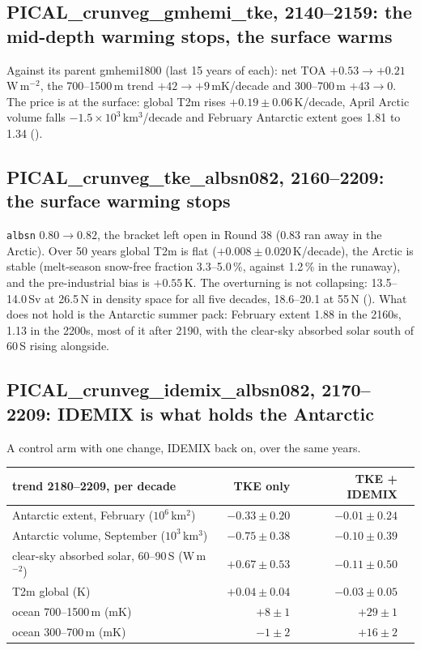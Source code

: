 \documentclass[10pt]{article}
\begin{document}
\subsection{PICAL\_crunveg\_gmhemi\_tke, 2140--2159: the mid-depth warming stops, the surface warms}\label{sub:r47tke}

Against its parent gmhemi1800 (last 15 years of each): net TOA $+0.53\to+0.21$\,W\,m$^{-2}$, the
700--1500\,m trend $+42\to+9$\,mK/decade and 300--700\,m $+43\to0$. The price is at the surface:
global T2m rises $+0.19\pm0.06$\,K/decade, April Arctic volume falls $-1.5\times10^3$\,km$^3$/decade and
February Antarctic extent goes 1.81 to 1.34 ().

\subsection{PICAL\_crunveg\_tke\_albsn082, 2160--2209: the surface warming stops}\label{sub:r47albsn}

\texttt{albsn} $0.80\to0.82$, the bracket left open in Round 38 (0.83 ran away in the Arctic). Over
50 years global T2m is flat ($+0.008\pm0.020$\,K/decade), the Arctic is stable (melt-season snow-free
fraction 3.3--5.0\,\%, against 1.2\,\% in the runaway), and the pre-industrial bias is $+0.55$\,K.
The overturning is not collapsing: 13.5--14.0\,Sv at 26.5\,N in density space for all five decades,
18.6--20.1 at 55\,N (). What does not hold is the Antarctic
summer pack: February extent 1.88 in the 2160s, 1.13 in the 2200s, most of it after 2190, with the
clear-sky absorbed solar south of 60\,S rising alongside.

\subsection{PICAL\_crunveg\_idemix\_albsn082, 2170--2209: IDEMIX is what holds the Antarctic}\label{sub:r47idemix}

A control arm with one change, IDEMIX back on, over the same years.

\begin{center}\small
\begin{tabular}{lrrl}
\toprule
trend 2180--2209, per decade & TKE only & TKE + IDEMIX & \\
\midrule
Antarctic extent, February ($10^6$\,km$^2$) & $-0.33\pm0.20$ & $-0.01\pm0.24$ & \\
Antarctic volume, September ($10^3$\,km$^3$) & $-0.75\pm0.38$ & $-0.10\pm0.39$ & \\
clear-sky absorbed solar, 60--90\,S (W\,m$^{-2}$) & $+0.67\pm0.53$ & $-0.11\pm0.50$ & \\
T2m global (K) & $+0.04\pm0.04$ & $-0.03\pm0.05$ & \\
ocean 700--1500\,m (mK) & $+8\pm1$ & $+29\pm1$ & \\
ocean 300--700\,m (mK) & $-1\pm2$ & $+16\pm2$ & \\
\bottomrule
\end{tabular}
\end{center}
\end{document}
